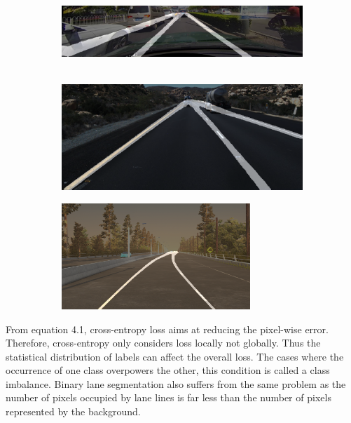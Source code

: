        \begin{figure}[h]
       \centering
       \caption{Initial binary lane segmentation results: (a) SCNN (Res18+CULane), (b) SCNN (Res18 + TuSimple) and (c) RESA (Res18 + sim3d)}
        \begin{subfigure}{0.6\textwidth}
                \includegraphics[width=1.2\linewidth, height=3cm]{images/SCNN_res_culane.png} 
                \caption{}
                \label{fig:subim1}
        \end{subfigure}
        \begin{subfigure}{0.4\textwidth}
                \includegraphics[width=1.2\linewidth, height=4cm]{images/SCNN_res_tusimple.png}
                \caption{}
                \label{fig:subim2}
        \end{subfigure}
        \newline
        \begin{subfigure}{0.4\textwidth}
                \includegraphics[width=1.2\linewidth, height=4cm]{images/Resa_r18_sim3d.png}
                \caption{}
                \label{fig:subim2}
        \end{subfigure}
        \label{fig:image2}
        \end{figure}
    
        From equation 4.1, cross-entropy loss aims at reducing the pixel-wise error. Therefore, cross-entropy only considers loss locally not globally. Thus the statistical distribution of labels can affect the overall loss. The cases where the occurrence of one class overpowers the other, this condition is called a class imbalance. Binary lane segmentation also suffers from the same problem as the number of pixels occupied by lane lines is far less than the number of pixels represented by the background. 
    

